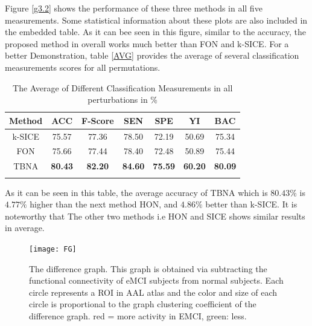 \documentclass[journal]{IEEEtran}
\begin{document}
	
	Figure \eqref{g3.2} shows the performance of these three methods in all five measurements. Some statistical information about these plots are also included in the embedded table. As it can bee seen in this figure, similar to the accuracy, the proposed method in overall works much better than FON and k-SICE. For a better Demonstration, table \eqref{AVG} provides the average of several classification measurements scores for all permutations. 
	\begin{table}
		\begin{center}
			\caption{The Average of Different Classification Measurements in all perturbations in \% }
			\begin{tabular}{@{}c*{6}{c}}
				\hline\hline
				Method&ACC& F-Score&SEN & SPE &YI & BAC 
				\\
				\hline
				k-SICE  &75.57& 77.36 & 78.50 & 72.19 & 50.69 & 75.34 
				\\
				FON   &75.66& 77.44 & 78.40 & 72.48 & 50.89 & 75.44  
				\\
				TBNA &\textbf{80.43}& \textbf{82.20} & \textbf{84.60} & \textbf{75.59} & \textbf{60.20} & \textbf{80.09}
				
				\\
				
				\hline\hline
				\label{AVG}
			\end{tabular}
		\end{center}
	\end{table}
	As it can be seen in this table, the average accuracy of TBNA which is $80.43 \%$ is $4.77\%$ higher than the next method HON, and $4.86 \%$ better than k-SICE. It is noteworthy that The other two methods i.e HON and SICE shows similar results in average.  
	
	\begin{figure}
		\centering
		\texttt{[image: FG]}
		\caption{
			The difference graph. This graph is obtained via subtracting the functional connectivity of eMCI subjects from normal subjects. Each circle represents a ROI in AAL atlas and the color and size of each circle is proportional to the graph clustering coefficient of the difference graph. red = more activity in EMCI, green: less. 
		}
		\label{g3.3}
	\end{figure}
	
\end{document}
